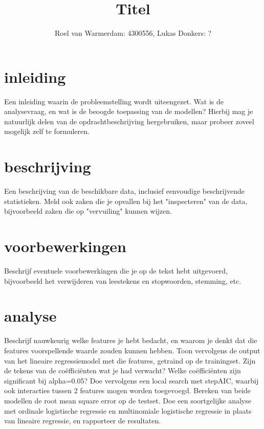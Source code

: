 \documentclass[12pt]{article}
\title{Titel}
\author{Roel van Warmerdam: 4300556, Lukas Donkers: ?}
\begin{document}
\maketitle

\section{ inleiding}

Een inleiding waarin de probleemstelling wordt uiteengezet. Wat is de analysevraag, en wat is de beoogde toepassing van de modellen? Hierbij mag je natuurlijk delen van de opdrachtbeschrijving hergebruiken, maar probeer zoveel mogelijk zelf te formuleren.

\section{beschrijving}
Een beschrijving van de beschikbare data, inclusief eenvoudige beschrijvende statistieken. Meld ook zaken die je opvallen bij het "inspecteren" van de data, bijvoorbeeld zaken die op "vervuiling" kunnen wijzen.

\section{voorbewerkingen}
Beschrijf eventuele voorbewerkingen die je op de tekst hebt uitgevoerd, bijvoorbeeld het verwijderen van leestekens en stopwoorden, stemming, etc.

\section{analyse}
Beschrijf nauwkeurig welke features je hebt bedacht, en waarom je denkt dat die features voorspellende waarde zouden kunnen hebben. Toon vervolgens de output van het lineaire regressiemodel met die features, getraind op de trainingset. Zijn de tekens van de coëfficiënten wat je had verwacht? Welke coëfficiënten zijn significant bij alpha=0.05? Doe vervolgens een local search met stepAIC, waarbij ook interacties tussen 2 features mogen worden toegevoegd. Bereken van beide modellen de root mean square error op de testset. Doe een soortgelijke analyse met ordinale logistische regressie en multinomiale logistische regressie in plaats van lineaire regressie, en rapporteer de resultaten.
\end{document}

